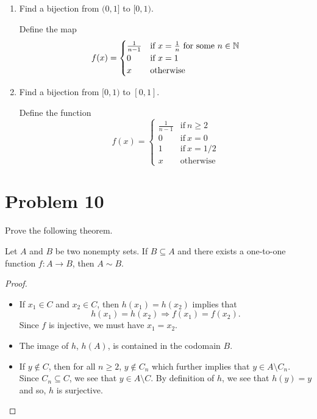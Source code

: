 \documentclass[11pt,a4paper]{article}
\begin{document}
\begin{enumerate}
\begin{proof}
        \end{proof}
    \item Find a bijection from \( (0,1]  \) to \( [0,1) \).
        \begin{solution}
          Define the map  
          \[  f(x) = 
          \begin{cases}
              \frac{ 1 }{ n - 1  }  &\text{if} \ x = \frac{ 1 }{ n }  \ \text{for some} \ n \in \mathbb{N}  \\
              0 &\text{if} \ x = 1 \\
              x &\text{otherwise}
          \end{cases}  \]
        \end{solution}
    \item Find a bijection from \(  [0,1)  \) to \( [0,1] \).
        \begin{solution}
          Define the function  
          \[  f(x) = 
          \begin{cases}
              \frac{ 1 }{ n - 1   } &\text{if} \ n \geq 2 \\   
              0 &\text{if} \ x = 0 \\ 
              1 &\text{if} \ x = 1/2 \\
              x &\text{otherwise} 
          \end{cases} \]
        \end{solution}

\end{enumerate}


\section{Problem 10} Prove the following theorem.

\begin{theorem}[ ]
    Let \( A  \) and \( B  \) be two nonempty sets. If \( B \subseteq A  \) and there exists a one-to-one function \( f: A \to B  \), then \( A \sim B  \).
\end{theorem}
\begin{proof}
\begin{itemize}
    \item If \( {x}_{1} \in C  \) and \( {x}_{2} \in C  \), then \( h({x}_{1}) = h({x}_{2})   \) implies that  
        \[  h({x}_{1}) = h({x}_{2}) \Longrightarrow f({x}_{1}) = f({x}_{2}). \]
        Since \( f \) is injective, we must have \( {x}_{1} = {x}_{2} \).
    \item The image of \( h  \), \( h(A) \), is contained in the codomain \( B  \).
    \item If \( y \notin C  \), then for all \( n \geq 2  \), \( y \notin {C}_{n} \) which further implies that \( y \in A \setminus  {C}_{n} \). Since \( {C}_{n} \subseteq  C  \), we see that \( y \in A \setminus  C \). By definition of \( h  \), we see that \( h(y) = y  \) and so, \( h  \) is surjective.
\end{itemize}
\end{proof}
\end{document}

